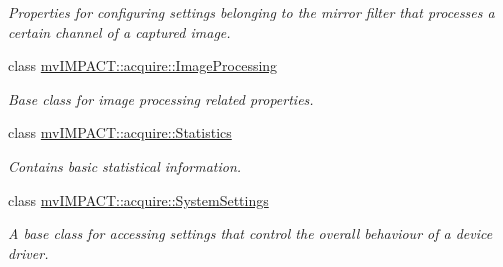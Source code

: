 \begin{DoxyCompactItemize}
\begin{DoxyCompactList}\small\item\em Properties for configuring settings belonging to the mirror filter that processes a certain channel of a captured image. \end{DoxyCompactList}\item 
class \hyperlink{classmv_i_m_p_a_c_t_1_1acquire_1_1_image_processing}{mv\+I\+M\+P\+A\+C\+T\+::acquire\+::\+Image\+Processing}
\begin{DoxyCompactList}\small\item\em Base class for image processing related properties. \end{DoxyCompactList}\item 
class \hyperlink{classmv_i_m_p_a_c_t_1_1acquire_1_1_statistics}{mv\+I\+M\+P\+A\+C\+T\+::acquire\+::\+Statistics}
\begin{DoxyCompactList}\small\item\em Contains basic statistical information. \end{DoxyCompactList}\item 
class \hyperlink{classmv_i_m_p_a_c_t_1_1acquire_1_1_system_settings}{mv\+I\+M\+P\+A\+C\+T\+::acquire\+::\+System\+Settings}
\begin{DoxyCompactList}\small\item\em A base class for accessing settings that control the overall behaviour of a device driver. \end{DoxyCompactList}\end{DoxyCompactItemize}
